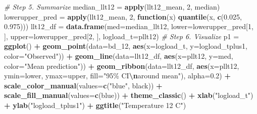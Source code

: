 \documentclass[
]{article}
\newenvironment{Shaded}{\begin{snugshade}}{\end{snugshade}}
\newcommand{\AttributeTok}[1]{\textcolor[rgb]{0.13,0.29,0.53}{#1}}
\newcommand{\CommentTok}[1]{\textcolor[rgb]{0.56,0.35,0.01}{\textit{#1}}}
\newcommand{\ControlFlowTok}[1]{\textcolor[rgb]{0.13,0.29,0.53}{\textbf{#1}}}
\newcommand{\DecValTok}[1]{\textcolor[rgb]{0.00,0.00,0.81}{#1}}
\newcommand{\FloatTok}[1]{\textcolor[rgb]{0.00,0.00,0.81}{#1}}
\newcommand{\FunctionTok}[1]{\textcolor[rgb]{0.13,0.29,0.53}{\textbf{#1}}}
\newcommand{\NormalTok}[1]{#1}
\newcommand{\OtherTok}[1]{\textcolor[rgb]{0.56,0.35,0.01}{#1}}
\newcommand{\SpecialCharTok}[1]{\textcolor[rgb]{0.81,0.36,0.00}{\textbf{#1}}}
\newcommand{\StringTok}[1]{\textcolor[rgb]{0.31,0.60,0.02}{#1}}
\begin{document}
\begin{Shaded}
\begin{Highlighting}[]
\CommentTok{\# Step 5. Summarize}
\NormalTok{median\_llt12 }\OtherTok{=} \FunctionTok{apply}\NormalTok{(llt12\_mean, }\DecValTok{2}\NormalTok{, median)}
\NormalTok{lowerupper\_pred }\OtherTok{=} \FunctionTok{apply}\NormalTok{(llt12\_mean, }\DecValTok{2}\NormalTok{, }\ControlFlowTok{function}\NormalTok{(x) }\FunctionTok{quantile}\NormalTok{(x, }\FunctionTok{c}\NormalTok{(}\FloatTok{0.025}\NormalTok{, }\FloatTok{0.975}\NormalTok{)))}
\NormalTok{llt12\_df }\OtherTok{=} \FunctionTok{data.frame}\NormalTok{(}\AttributeTok{med=}\NormalTok{median\_llt12, }
                     \AttributeTok{lower=}\NormalTok{lowerupper\_pred[}\DecValTok{1}\NormalTok{, ], }
                     \AttributeTok{upper=}\NormalTok{lowerupper\_pred[}\DecValTok{2}\NormalTok{, ],}
                     \AttributeTok{logload\_t=}\NormalTok{pllt12)}
\CommentTok{\# Step 6. Visualize}
\NormalTok{p1 }\OtherTok{=} \FunctionTok{ggplot}\NormalTok{() }\SpecialCharTok{+} \FunctionTok{geom\_point}\NormalTok{(}\AttributeTok{data=}\NormalTok{bd\_12, }\FunctionTok{aes}\NormalTok{(}\AttributeTok{x=}\NormalTok{logload\_t, }\AttributeTok{y=}\NormalTok{logload\_tplus1, }\AttributeTok{color=}\StringTok{"Observed"}\NormalTok{)) }\SpecialCharTok{+}
           \FunctionTok{geom\_line}\NormalTok{(}\AttributeTok{data=}\NormalTok{llt12\_df, }\FunctionTok{aes}\NormalTok{(}\AttributeTok{x=}\NormalTok{pllt12, }\AttributeTok{y=}\NormalTok{med, }\AttributeTok{color=}\StringTok{"Mean prediction"}\NormalTok{)) }\SpecialCharTok{+}
           \FunctionTok{geom\_ribbon}\NormalTok{(}\AttributeTok{data=}\NormalTok{llt12\_df, }\FunctionTok{aes}\NormalTok{(}\AttributeTok{x=}\NormalTok{pllt12, }\AttributeTok{ymin=}\NormalTok{lower, }\AttributeTok{ymax=}\NormalTok{upper, }\AttributeTok{fill=}\StringTok{"95\% CI}\SpecialCharTok{\textbackslash{}n}\StringTok{around mean"}\NormalTok{),}
                                         \AttributeTok{alpha=}\FloatTok{0.2}\NormalTok{) }\SpecialCharTok{+}
           \FunctionTok{scale\_color\_manual}\NormalTok{(}\AttributeTok{values=}\FunctionTok{c}\NormalTok{(}\StringTok{"blue"}\NormalTok{, }\StringTok{\textquotesingle{}black\textquotesingle{}}\NormalTok{)) }\SpecialCharTok{+}
           \FunctionTok{scale\_fill\_manual}\NormalTok{(}\AttributeTok{values=}\FunctionTok{c}\NormalTok{(}\StringTok{\textquotesingle{}blue\textquotesingle{}}\NormalTok{)) }\SpecialCharTok{+}
           \FunctionTok{theme\_classic}\NormalTok{() }\SpecialCharTok{+}
           \FunctionTok{xlab}\NormalTok{(}\StringTok{"logload\_t"}\NormalTok{) }\SpecialCharTok{+}
       \FunctionTok{ylab}\NormalTok{(}\StringTok{"logload\_tplus1"}\NormalTok{) }\SpecialCharTok{+}
       \FunctionTok{ggtitle}\NormalTok{(}\StringTok{"Temperature 12 C"}\NormalTok{)}



\end{Highlighting}
\end{Shaded}
\end{document}
